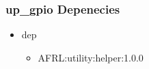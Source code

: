 \subsubsection{up\_gpio Depenecies}
\begin{itemize}
\item dep
	\begin{itemize}
	\item AFRL:utility:helper:1.0.0
	\end{itemize}
\end{itemize}
